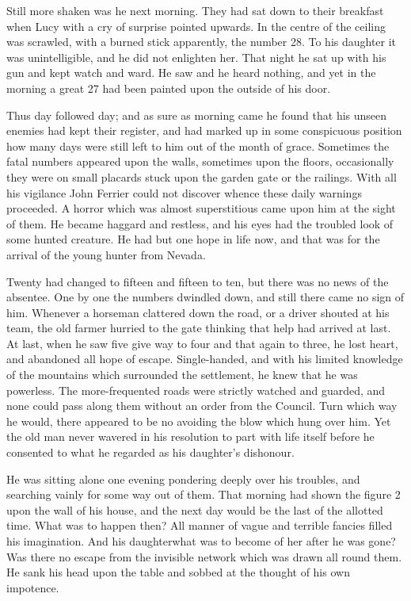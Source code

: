 \documentclass[12pt,english]{book}
\begin{document}
Still more shaken was he next morning. They had sat down to their
breakfast when Lucy with a cry of surprise pointed upwards. In the
centre of the ceiling was scrawled, with a burned stick apparently,
the number 28. To his daughter it was unintelligible, and he did not
enlighten her. That night he sat up with his gun and kept watch and
ward. He saw and he heard nothing, and yet in the morning a great
27 had been painted upon the outside of his door.

Thus day followed day; and as sure as morning came he found that his
unseen enemies had kept their register, and had marked up in some
conspicuous position how many days were still left to him out of the
month of grace. Sometimes the fatal numbers appeared upon the walls,
sometimes upon the floors, occasionally they were on small placards
stuck upon the garden gate or the railings. With all his vigilance
John Ferrier could not discover whence these daily warnings proceeded.
A horror which was almost superstitious came upon him at the sight
of them. He became haggard and restless, and his eyes had the troubled
look of some hunted creature. He had but one hope in life now, and
that was for the arrival of the young hunter from Nevada.

Twenty had changed to fifteen and fifteen to ten, but there was no
news of the absentee. One by one the numbers dwindled down, and still
there came no sign of him. Whenever a horseman clattered down the
road, or a driver shouted at his team, the old farmer hurried to the
gate thinking that help had arrived at last. At last, when he saw
five give way to four and that again to three, he lost heart, and
abandoned all hope of escape. Single-handed, and with his limited
knowledge of the mountains which surrounded the settlement, he knew
that he was powerless. The more-frequented roads were strictly watched
and guarded, and none could pass along them without an order from
the Council. Turn which way he would, there appeared to be no avoiding
the blow which hung over him. Yet the old man never wavered in his
resolution to part with life itself before he consented to what he
regarded as his daughter's dishonour.

He was sitting alone one evening pondering deeply over his troubles,
and searching vainly for some way out of them. That morning had shown
the figure 2 upon the wall of his house, and the next day would be
the last of the allotted time. What was to happen then? All manner
of vague and terrible fancies filled his imagination. And his daughter\mdsh{---}what
was to become of her after he was gone? Was there no escape from the
invisible network which was drawn all round them. He sank his head
upon the table and sobbed at the thought of his own impotence.
\end{document}
